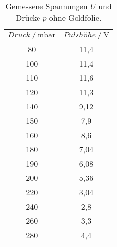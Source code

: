\begin{table}[H] 
   \centering 
   \caption{Gemessene Spannungen $U$ und Drücke $p$ ohne Goldfolie.} 
   \label{tab:ohne2} 
   \begin{tabular} { c c } 
 \toprule 
 {$Druck\:/\: \mathrm{mbar}$} & {$Pulshöhe\:/\: \mathrm{V}$} \\ 
    \midrule 
    80 & 11,4 \\ 
    100 & 11,4 \\ 
    110 & 11,6 \\ 
    120 & 11,3 \\ 
    140 & 9,12 \\ 
    150 & 7,9 \\ 
    160 & 8,6 \\ 
    180 & 7,04 \\ 
    190 & 6,08 \\ 
    200 & 5,36 \\ 
    220 & 3,04 \\ 
    240 & 2,8 \\ 
    260 & 3,3 \\ 
    280 & 4,4 \\ 
    \bottomrule 
  \end{tabular}
\end{table}
